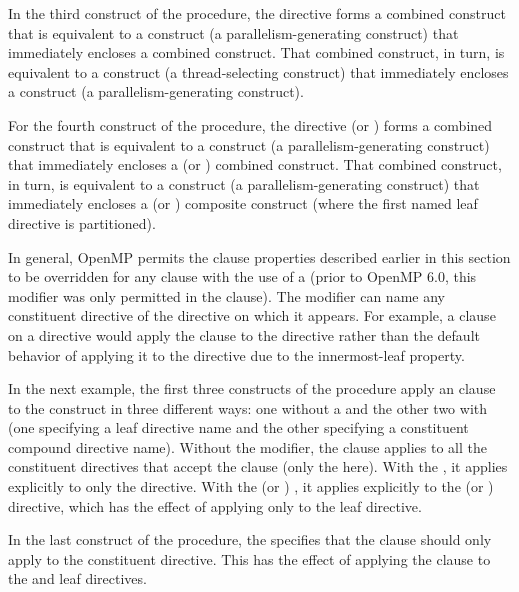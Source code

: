 In the third construct of the procedure, the directive  forms a combined construct that is equivalent to a 
construct (a parallelism-generating construct) that immediately encloses
a  combined construct. That combined construct, in turn,
is equivalent to a  construct (a thread-selecting
construct) that immediately encloses a  construct (a
parallelism-generating construct).

For the fourth construct of the procedure, the directive  (or ) forms
a combined construct that is equivalent to a  construct (a
parallelism-generating construct) that immediately encloses a  (or ) combined
construct. That combined construct, in turn, is equivalent to a 
construct (a parallelism-generating construct) that immediately encloses
a  (or ) composite
construct (where the first named leaf directive is partitioned).


In general, OpenMP permits the clause properties described earlier in this
section to be overridden for any clause with the use of a
 (prior to OpenMP 6.0, this modifier was only
permitted in the  clause). The modifier can name any constituent
directive of the directive on which it appears. For example, a
 clause on a  directive would
apply the  clause to the  directive rather than
the default behavior of applying it to the  directive due to the
innermost-leaf property.

In the next example, the first three constructs of the
 procedure apply an  clause to the
 construct in three different ways: one without a
 and the other two with
 (one specifying a leaf directive name and the
other specifying a constituent compound directive name). Without the modifier,
the  clause applies to all the constituent directives that accept the
 clause (only the  here). With the 
, it applies explicitly to only the
 directive. With the  (or )
, it applies explicitly to the  (or ) directive, which has the effect of applying only
to the  leaf directive.

In the last construct of the procedure, the  specifies
that the  clause should only apply to the 
constituent directive. This has the effect of applying the  clause to
the  and  leaf directives.

